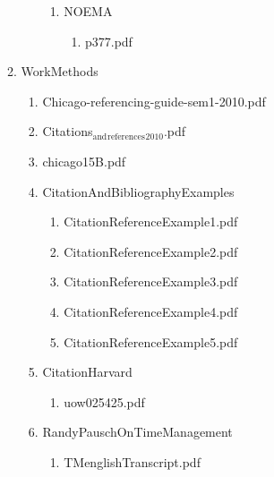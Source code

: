 \documentclass[11pt]{article}
\begin{document}
\begin{enumerate}
\begin{enumerate}
\begin{enumerate}
\begin{enumerate}
\item ΝΟΕΜΑ
\label{sec-1-1-1-1-7-3-53}
\begin{enumerate}
\item p377.pdf
\label{sec-1-1-1-1-7-3-53-1}
\end{enumerate}
\end{enumerate}
\end{enumerate}

\item WorkMethods
\label{sec-1-1-1-1-8}
\begin{enumerate}
\item Chicago-referencing-guide-sem1-2010.pdf
\label{sec-1-1-1-1-8-1}

\item Citations$_{\text{and}}$$_{\text{references}}$$_{\text{2010}}$.pdf
\label{sec-1-1-1-1-8-2}

\item chicago15B.pdf
\label{sec-1-1-1-1-8-3}

\item CitationAndBibliographyExamples
\label{sec-1-1-1-1-8-4}
\begin{enumerate}
\item CitationReferenceExample1.pdf
\label{sec-1-1-1-1-8-4-1}

\item CitationReferenceExample2.pdf
\label{sec-1-1-1-1-8-4-2}

\item CitationReferenceExample3.pdf
\label{sec-1-1-1-1-8-4-3}

\item CitationReferenceExample4.pdf
\label{sec-1-1-1-1-8-4-4}

\item CitationReferenceExample5.pdf
\label{sec-1-1-1-1-8-4-5}
\end{enumerate}

\item CitationHarvard
\label{sec-1-1-1-1-8-5}
\begin{enumerate}
\item uow025425.pdf
\label{sec-1-1-1-1-8-5-1}
\end{enumerate}

\item RandyPauschOnTimeManagement
\label{sec-1-1-1-1-8-6}
\begin{enumerate}
\item TMenglishTranscript.pdf
\label{sec-1-1-1-1-8-6-1}
\end{enumerate}


\end{enumerate}
\end{enumerate}
\end{enumerate}
\end{document}

